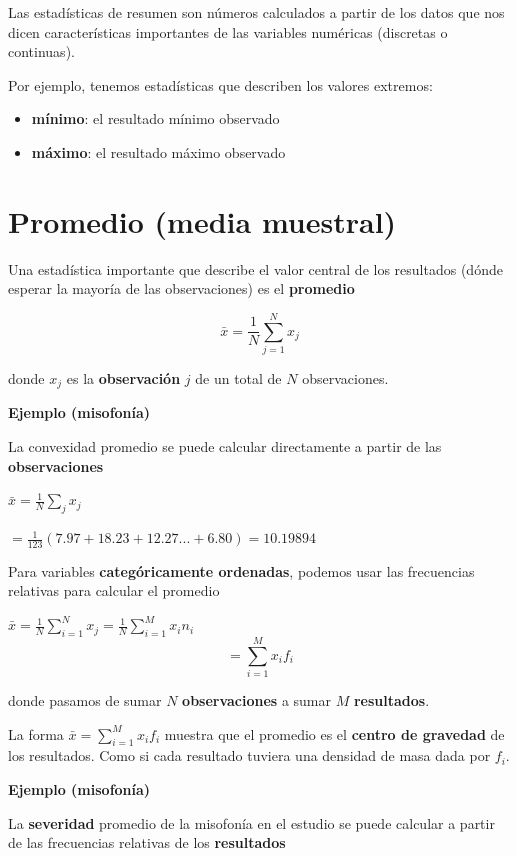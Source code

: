\documentclass[
]{book}
\providecommand{\tightlist}{%
  \setlength{\itemsep}{0pt}\setlength{\parskip}{0pt}}
\begin{document}
Las estadísticas de resumen son números calculados a partir de los datos que nos dicen características importantes de las variables numéricas (discretas o continuas).

Por ejemplo, tenemos estadísticas que describen los valores extremos:

\begin{itemize}
\tightlist
\item
  \textbf{mínimo}: el resultado mínimo observado
\item
  \textbf{máximo}: el resultado máximo observado
\end{itemize}

\hypertarget{promedio-media-muestral}{%
\section{Promedio (media muestral)}\label{promedio-media-muestral}}

Una estadística importante que describe el valor central de los resultados (dónde esperar la mayoría de las observaciones) es el \textbf{promedio}

\[\bar{x}=\frac{1}{N} \sum_{j=1}^N x_j\]

donde \(x_j\) es la \textbf{observación} \(j\) de un total de \(N\) observaciones.

\textbf{Ejemplo (misofonía)}

La convexidad promedio se puede calcular directamente a partir de las \textbf{observaciones}

\(\bar{x}= \frac{1}{N}\sum_j x_j\)

\(= \frac{1}{123}(7.97 + 18.23 + 12.27... + 6.80) = 10.19894\)

Para variables \textbf{categóricamente ordenadas}, podemos usar las frecuencias relativas para calcular el promedio

\(\bar{x}=\frac{1}{N}\sum_{i=1}^N x_j=\frac{1}{N}\sum_{i=1}^M x_in_ {i}\)
\[=\sum_{i=1}^M x_if_{i}\]

donde pasamos de sumar \(N\) \textbf{observaciones} a sumar \(M\) \textbf{resultados}.

La forma \(\bar{x}= \sum_{i = 1}^M x_i f_i\) muestra que el promedio es el \textbf{centro de gravedad} de los resultados. Como si cada resultado tuviera una densidad de masa dada por \(f_i\).

\textbf{Ejemplo (misofonía)}

La \textbf{severidad} promedio de la misofonía en el estudio se puede calcular a partir de las frecuencias relativas de los \textbf{resultados}
\end{document}
